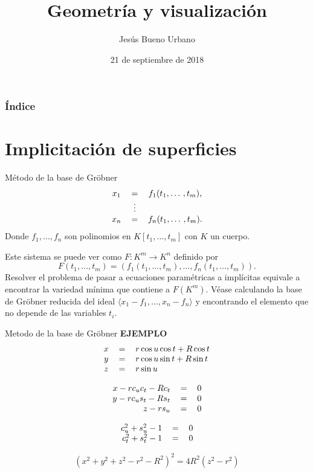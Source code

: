 \documentclass{beamer}
\title[]{Geometría y visualización}
\subtitle{}
\author[Jesús Bueno Urbano]{Jesús Bueno Urbano\\\medskip{Directores:\\Pedro A. García Sánchez\\Carlos Ureña Almagro}}
\institute[Universidad de Granada]{Trabajo Fin de Máster\\Máster en Matemáticas}
\date[21/09/2018]{21 de septiembre de 2018}
\begin{document}
\begin{frame}
  \titlepage
\end{frame}

\begin{frame}
  \frametitle{Índice}
  \tableofcontents
\end{frame}

\section{Implicitación de superficies}

\begin{frame}{Método de la base de Gröbner}
\begin{equation}
    \begin{tabular}{c c c}
        $x_1$ & = & $f_1(t_1, \dotso, t_m)$, \\
         & $\vdots$ & \\
        $x_n$ & = & $f_n(t_1, \dotso, t_m).$
    \end{tabular}
    \nonumber
\end{equation}
Donde $f_1, \dotso, f_n$ son polinomios en $K[t_1, \dotso, t_m]$ con $K$ un cuerpo.
\pause

Este sistema se puede ver como $F : K^m \to K^n$ definido por
$$F(t_1,\dotso, t_m) = (f_1(t_1,\dotso, t_m), \dotso, f_n(t_1,\dotso, t_m)).$$
\pause
Resolver el problema de pasar a ecuaciones paramétricas a implícitas equivale a encontrar la variedad mínima que contiene a $F(K^m)$. Véase calculando la base de Gröbner reducida del ideal $\langle x_1 - f_1, \dotso, x_n - f_n \rangle$ y encontrando el elemento que no depende de las variables $t_i$.
\end{frame}

\begin{frame}{Metodo de la base de Gröbner}
\textbf{EJEMPLO}
\begin{equation}
\begin{tabular}{c c l}
$x$ & $=$ & $r \cos u \cos t + R \cos t$ \\
$y$ & $=$ & $r \cos u \sin t + R \sin t$ \\
$z$ & $=$ & $r \sin u$
\end{tabular}
\nonumber
\end{equation}
\pause

\begin{equation}
\begin{tabular}{r c c}
$x - r c_u c_t - R c_t$ & $=$ & $0$ \\
$y - r c_u s_t - R s_t$ & $=$ & $0$ \\
$z - r s_u$ & $=$ & $0$
\end{tabular}
\nonumber
\end{equation}
\pause

\begin{equation}
\begin{tabular}{r c c}
$c_u^2 + s_u^2 - 1$ & $=$ & $0$ \\
$c_t^2 + s_t^2 - 1$ & $=$ & $0$
\end{tabular}
\nonumber
\end{equation}
\pause

$$(x^2 + y^2 + z^2 - r^2 - R^2)^2 = 4 R^2 (z^2 - r^2)$$
\end{frame}
\end{document}
